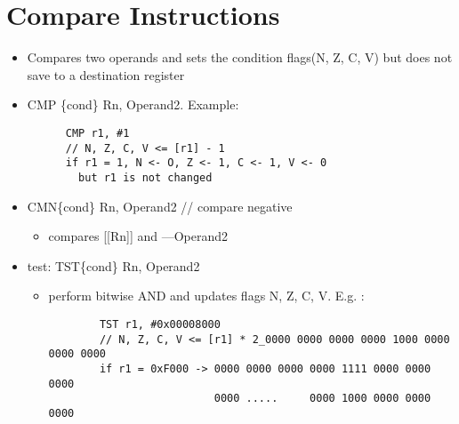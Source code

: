 \documentclass[12pt]{report}
\begin{document}
\section{Compare Instructions}
  \begin{itemize}
    \item Compares two operands and sets the condition flags(N, Z, C, V) but does not
    save to a destination register\\
    \item CMP \{cond\} Rn, Operand2. Example:
    \begin{lstlisting}
      CMP r1, #1
      // N, Z, C, V <= [r1] - 1
      if r1 = 1, N <- O, Z <- 1, C <- 1, V <- 0
        but r1 is not changed
    \end{lstlisting}

    \item CMN\{cond\} Rn, Operand2 // compare negative
    \begin{itemize}
      \item compares [[Rn]] and ---Operand2
    \end{itemize}
    \item test: TST\{cond\} Rn, Operand2
    \begin{itemize}
      \item perform bitwise AND and updates flags N, Z, C, V. E.g. :
      \begin{lstlisting}
        TST r1, #0x00008000
        // N, Z, C, V <= [r1] * 2_0000 0000 0000 0000 1000 0000 0000 0000
        if r1 = 0xF000 -> 0000 0000 0000 0000 1111 0000 0000 0000
                          0000 .....     0000 1000 0000 0000 0000
      \end{lstlisting}
    \end{itemize}


\end{itemize}
\end{document}
